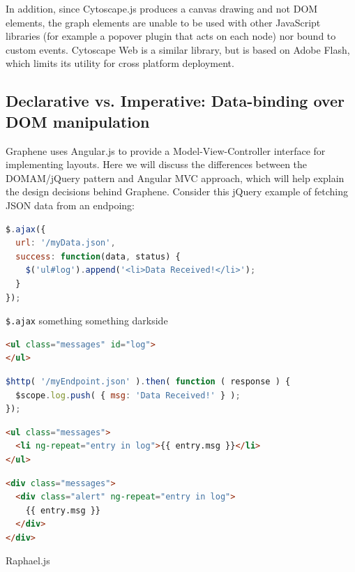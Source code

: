 In addition, since Cytoscape.js produces a canvas drawing and not DOM elements, the graph elements are unable to be used with other JavaScript libraries (for example a popover plugin that acts on each node) nor bound to custom events.
Cytoscape Web \autocite{cytoscape2014web} is a similar library, but is based on Adobe Flash, which limits its utility for cross platform deployment.

\subsection{Declarative vs. Imperative: Data-binding over DOM manipulation}
\label{sec:declarative-vs-imperative}

Graphene uses Angular.js \autocite{google2014angular} to provide a Model-View-Controller \autocite{krasner1988description} interface for implementing layouts.
Here we will discuss the differences between the DOMAM/jQuery pattern and Angular MVC approach, which will help explain the design decisions behind Graphene.
Consider this jQuery example of fetching JSON data from an endpoing:

\begin{lstlisting}[language=JavaScript]
$.ajax({
  url: '/myData.json',
  success: function(data, status) {
    $('ul#log').append('<li>Data Received!</li>');
  }
});
\end{lstlisting}

\texttt{\$.ajax} something something darkside

\begin{lstlisting}[language=html]
<ul class="messages" id="log">
</ul>
\end{lstlisting}

\begin{lstlisting}[language=JavaScript]
$http( '/myEndpoint.json' ).then( function ( response ) {
  $scope.log.push( { msg: 'Data Received!' } );
});
\end{lstlisting}

\begin{lstlisting}[language=html]
<ul class="messages">
  <li ng-repeat="entry in log">{{ entry.msg }}</li>
</ul>
\end{lstlisting}

\begin{lstlisting}[language=html]
<div class="messages">
  <div class="alert" ng-repeat="entry in log">
    {{ entry.msg }}
  </div>
</div>
\end{lstlisting}

Raphael.js \autocite{sencha2014raphael}








